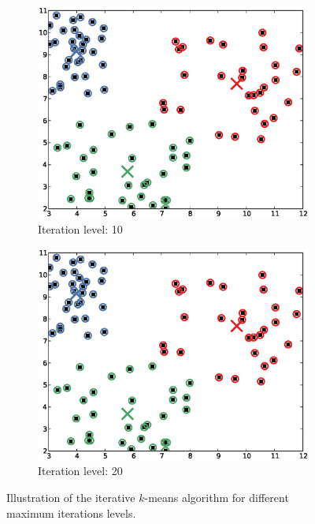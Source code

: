 \documentclass[a4paper,10pt,twoside]{article}
\begin{document}
\begin{figure}
  \begin{subfigure}{.44\textwidth}
    \includegraphics[width=\textwidth,height=.3\textheight,keepaspectratio]{figure_1_3.eps}
    \caption{Iteration level: 10}
  \end{subfigure}
  \hspace*{\fill}
  \begin{subfigure}{.44\textwidth}
    \includegraphics[width=\textwidth,height=.3\textheight,keepaspectratio]{figure_1_4.eps}
    \caption{Iteration level: 20}
  \end{subfigure}

  \caption{Illustration of the iterative $k$-means algorithm for different maximum iterations levels.}%
  \label{fig:kmeansiter}
\end{figure}
\end{document}
